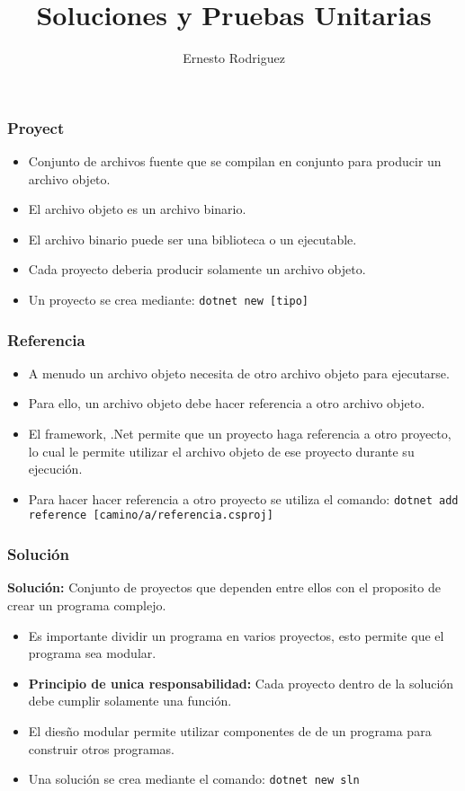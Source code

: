 \documentclass{beamer}
\title{Soluciones y Pruebas Unitarias}
\author{Ernesto Rodriguez}
\institute{
    Universidad del Itsmo \\
    \medskip \textit{erodriguez@unis.edu.gt}
}
\date[\today]{}
\begin{document}
\begin{frame}
\titlepage
\end{frame}

\begin{frame}
    \frametitle{Proyect}
    \begin{itemize}
        \item{Conjunto de archivos fuente que se compilan en conjunto para producir un archivo objeto.}
        \item{El archivo objeto es un archivo binario.}
        \item{El archivo binario puede ser una biblioteca o un ejecutable.}
        \item{Cada proyecto deberia producir solamente un archivo objeto.}
        \item{Un proyecto se crea mediante: \texttt{dotnet new [tipo]}}
    \end{itemize}
\end{frame}

\begin{frame}
    \frametitle{Referencia}
    \begin{itemize}
        \item{A menudo un archivo objeto necesita de otro archivo objeto para ejecutarse.}
        \item{Para ello, un archivo objeto debe hacer referencia a otro archivo objeto.}
        \item{El framework, .Net permite que un proyecto haga referencia a otro proyecto,
            lo cual le permite utilizar el archivo objeto de ese proyecto durante
            su ejecuci\'on.}
        \item{Para hacer hacer referencia a otro proyecto se utiliza el comando:
            \texttt{dotnet add reference [camino/a/referencia.csproj]}}
    \end{itemize}
\end{frame}

\begin{frame}
    \frametitle{Soluci\'on}
    {\bf Soluci\'on:} Conjunto de proyectos que dependen entre ellos
    con el proposito de crear un programa complejo.
    \begin{itemize}
        \item{Es importante dividir un programa en varios proyectos,
        esto permite que el programa sea modular.}
        \item{{\bf Principio de unica responsabilidad:} Cada proyecto dentro de la soluci\'on debe cumplir
        solamente una funci\'on.}
        \item{El dies\~no modular permite utilizar componentes de de un
        programa para construir otros programas.}
        \item{Una soluci\'on se crea mediante el comando: \texttt{dotnet new sln}}
    \end{itemize}
\end{frame}
\end{document}
